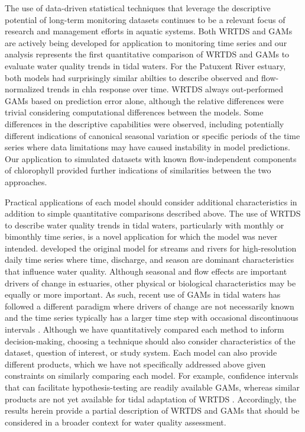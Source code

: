 \documentclass[letterpaper,12pt,oneside]{article}\usepackage[]{graphicx}\usepackage[]{color}
\begin{document}
The use of data-driven statistical techniques that leverage the descriptive potential of long-term monitoring datasets continues to be a relevant focus of research and management efforts in aquatic systems.  Both \ac{WRTDS} and \acp{GAM} are actively being developed for application to monitoring time series and our analysis represents the first quantitative comparison of \ac{WRTDS} and \acp{GAM} to evaluate water quality trends in tidal waters.  For the Patuxent River estuary, both models had surprisingly similar abilties to describe observed and flow-normalized trends in \ac{chla} response over time.  \ac{WRTDS} always out-performed \acp{GAM} based on prediction error alone, although the relative differences were trivial considering computational differences between the models.  Some differences in the descriptive capabilities were observed, including potentially different indications of canonical seasonal variation or specific periods of the time series where data limitations may have caused instability in model predictions.  Our application to simulated datasets with known flow-independent components of chlorophyll provided further indications of similarities between the two approaches.  

Practical applications of each model should consider additional characteristics in addition to simple quantitative comparisons described above.  The use of \ac{WRTDS} to describe water quality trends in tidal waters, particularly with monthly or bimonthly time series, is a novel application for which the model was never intended.  \cite{Hirsch10} developed the original model for streams and rivers for high-resolution daily time series where time, discharge, and season are dominant characteristics that influence water quality.  Although seasonal and flow effects are important drivers of change in estuaries, other physical or biological characteristics may be equally or more important.  As such, recent use of \acp{GAM} in tidal waters has followed a different paradigm where drivers of change are not necessarily known and the time series typically has a larger time step with occasional discontinuous intervals \citep[E. S. Perry, personal communication,][]{Harding15}.  Although we have quantitatively compared each method to inform decision-making, choosing a technique should also consider characteristics of the dataset, question of interest, or study system.  Each model can also provide different products, which we have not specifically addressed above given constraints on similarly comparing each model.  For example, confidence intervals that can facilitate hypothesis-testing are readily available \acp{GAM}, whereas similar products are not yet available for tidal adaptation of \ac{WRTDS} \cite[but see][]{Hirsch15}.  Accordingly, the results herein provide a partial description of \ac{WRTDS} and \acp{GAM} that should be considered in a broader context for water quality assessment.
\end{document}
